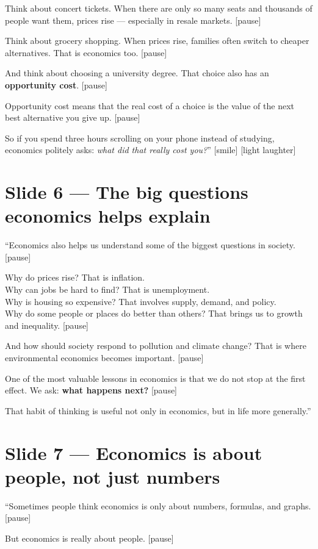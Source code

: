 \documentclass[12pt]{article}
\begin{document}
Think about concert tickets. When there are only so many seats and thousands of people want them, prices rise --- especially in resale markets. [pause]

Think about grocery shopping. When prices rise, families often switch to cheaper alternatives. That is economics too. [pause]

And think about choosing a university degree. That choice also has an \textbf{opportunity cost}. [pause]

Opportunity cost means that the real cost of a choice is the value of the next best alternative you give up. [pause]

So if you spend three hours scrolling on your phone instead of studying, economics politely asks: \textit{what did that really cost you?}'' [smile] [light laughter]

\section*{Slide 6 --- The big questions economics helps explain}

``Economics also helps us understand some of the biggest questions in society. [pause]

Why do prices rise? That is inflation.\\
Why can jobs be hard to find? That is unemployment.\\
Why is housing so expensive? That involves supply, demand, and policy.\\
Why do some people or places do better than others? That brings us to growth and inequality. [pause]

And how should society respond to pollution and climate change? That is where environmental economics becomes important. [pause]

One of the most valuable lessons in economics is that we do not stop at the first effect. We ask: \textbf{what happens next?} [pause]

That habit of thinking is useful not only in economics, but in life more generally.''
\newpage
\section*{Slide 7 --- Economics is about people, not just numbers}

``Sometimes people think economics is only about numbers, formulas, and graphs. [pause]

But economics is really about people. [pause]
\end{document}
